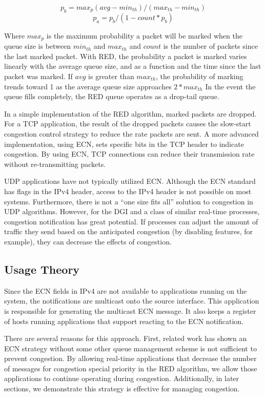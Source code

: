 \begin{equation}
p_{b} = max_p (avg - min_{th}) / (max_{th}-min_{th})
\end{equation}
\begin{equation}
p_{a} = p_{b} / (1-count * p_b)
\end{equation}

Where $max_p$ is the maximum probability a packet will be marked when the queue size is between $min_{th}$ and $max_{th}$ and $count$ is the number of packets since the last marked packet.
With \ac{RED}, the probability a packet is marked varies linearly with the average queue size, and as a function and the time since the last packet was marked.
If $avg$ is greater than $max_{th}$, the probability of marking trends toward 1 as the average queue size approaches $2*max_{th}$
In the event the queue fills completely, the \ac{RED} queue operates as a drop-tail queue.

In a simple implementation of the \ac{RED} algorithm, marked packets are dropped.
For a TCP application, the result of the dropped packets causes the slow-start congestion control strategy to reduce the rate packets are sent.
A more advanced implementation, using \ac{ECN}, sets specific bits in the TCP header to indicate congestion.
By using \ac{ECN}, TCP connections can reduce their transmission rate without re-transmitting packets.

UDP applications have not typically utilized \ac{ECN}.
Although the \ac{ECN} standard has flags in the IPv4 header, access to the IPv4 header is not possible on most systems.
Furthermore, there is not a ``one size fits all'' solution to congestion in UDP algorithms.
However, for the \ac{DGI} and a class of similar real-time processes, congestion notification has great potential.
If processes can adjust the amount of traffic they send based on the anticipated congestion (by disabling features, for example), they can decrease the effects of congestion.


\subsection{Usage Theory}
Since the \ac{ECN} fields in IPv4 are not available to applications running on the system, the notifications are multicast onto the source interface.
This application is responsible for generating the multicast ECN message.
It also keeps a register of hosts running applications that support reacting to the \ac{ECN} notification.

There are several reasons for this approach.
First, related work has shown an \ac{ECN} strategy without some other queue management scheme is not sufficient to prevent congestion.
By allowing real-time applications that decrease the number of messages for congestion special priority in the \ac{RED} algorithm, we allow those applications to continue operating during congestion.
Additionally, in later sections, we demonstrate this strategy is effective for managing congestion.

